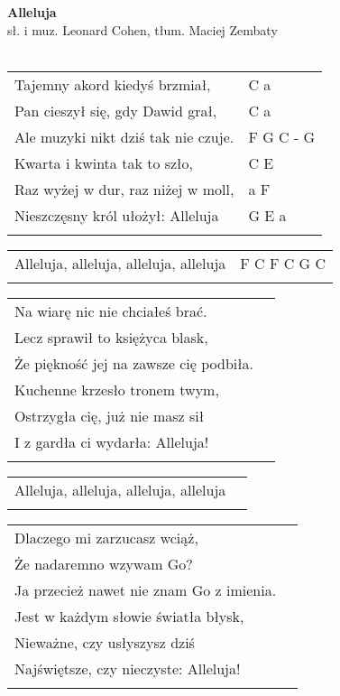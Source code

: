\documentclass[a5paper]{article}
\begin{document}


\noindent
\fontsize{12pt}{15pt}\selectfont
\textbf{Alleluja} \\
\fontsize{8pt}{10pt}\selectfont
sł. i muz. Leonard Cohen, tłum. Maciej Zembaty \\ \\
\fontsize{10pt}{12pt}\selectfont
{}
\begin{tabular}{@{}p{8.5cm}p{3cm}@{}}
\noindent
Tajemny akord kiedyś brzmiał, & C a \\
Pan cieszył się, gdy Dawid grał, & C a\\
Ale muzyki nikt dziś tak nie czuje. & F G C - G \\
Kwarta i kwinta tak to szło, & C E\\
Raz wyżej w dur, raz niżej w moll, & a F \\
Nieszczęsny król ułożył: Alleluja & G E a\\ \\
\end{tabular}

\noindent
\begin{tabular}{@{}p{7.5cm}p{3cm}@{}}
Alleluja, alleluja, alleluja, alleluja & F C F C G C\\\\
\end{tabular}

\noindent
\begin{tabular}{@{}p{8.5cm}p{3cm}@{}}
Na wiarę nic nie chciałeś brać.\\
Lecz sprawił to księżyca blask,\\
Że piękność jej na zawsze cię podbiła.\\
Kuchenne krzesło tronem twym,\\
Ostrzygła cię, już nie masz sił\\
I z gardła ci wydarła: Alleluja!\\\\
\end{tabular}

\noindent
\begin{tabular}{@{}p{8.5cm}p{3cm}@{}}
Alleluja, alleluja, alleluja, alleluja\\\\
\end{tabular}

\noindent
\begin{tabular}{@{}p{8.5cm}p{3cm}@{}}
Dlaczego mi zarzucasz wciąż,\\
Że nadaremno wzywam Go?\\
Ja przecież nawet nie znam Go z imienia.\\
Jest w każdym słowie światła błysk,\\
Nieważne, czy usłyszysz dziś\\
Najświętsze, czy nieczyste: Alleluja!\\\\
\end{tabular}
\end{document}
